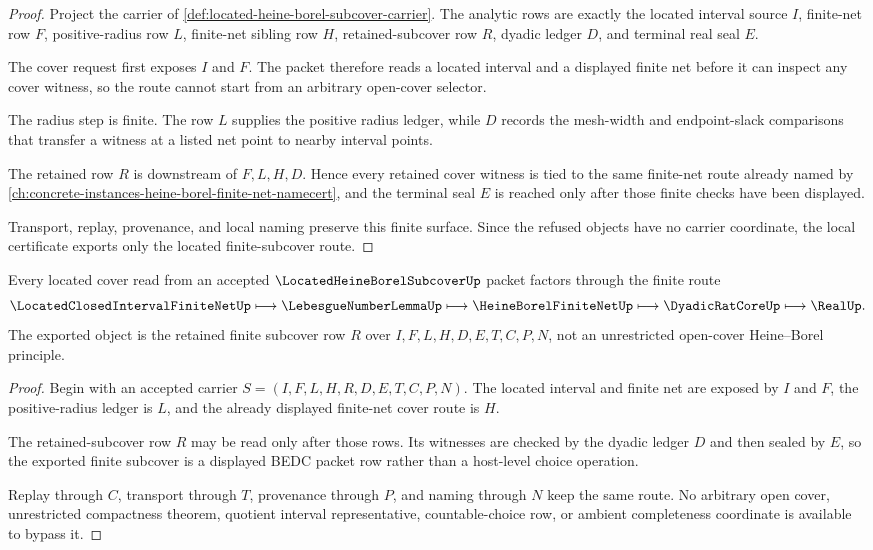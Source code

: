 \begin{proof}
Project the carrier of \autoref{def:located-heine-borel-subcover-carrier}. The analytic rows are exactly the located interval source $I$, finite-net row $F$, positive-radius row $L$, finite-net sibling row $H$, retained-subcover row $R$, dyadic ledger $D$, and terminal real seal $E$.

The cover request first exposes $I$ and $F$. The packet therefore reads a located interval and a displayed finite net before it can inspect any cover witness, so the route cannot start from an arbitrary open-cover selector.

The radius step is finite. The row $L$ supplies the positive radius ledger, while $D$ records the mesh-width and endpoint-slack comparisons that transfer a witness at a listed net point to nearby interval points.

The retained row $R$ is downstream of $F,L,H,D$. Hence every retained cover witness is tied to the same finite-net route already named by \autoref{ch:concrete-instances-heine-borel-finite-net-namecert}, and the terminal seal $E$ is reached only after those finite checks have been displayed.

Transport, replay, provenance, and local naming preserve this finite surface. Since the refused objects have no carrier coordinate, the local certificate exports only the located finite-subcover route.
\end{proof}

\begin{theorem}
\label{thm:located-heine-borel-subcover-finite-net-route}
Every located cover read from an accepted $\LocatedHeineBorelSubcoverUp$ packet factors through the finite route
$$
\LocatedClosedIntervalFiniteNetUp \longmapsto \LebesgueNumberLemmaUp \longmapsto \HeineBorelFiniteNetUp \longmapsto \DyadicRatCoreUp \longmapsto \RealUp .
$$
The exported object is the retained finite subcover row $R$ over $I,F,L,H,D,E,T,C,P,N$, not an unrestricted open-cover Heine--Borel principle.
\end{theorem}
\begin{proof}
Begin with an accepted carrier $S=(I,F,L,H,R,D,E,T,C,P,N)$. The located interval and finite net are exposed by $I$ and $F$, the positive-radius ledger is $L$, and the already displayed finite-net cover route is $H$.

The retained-subcover row $R$ may be read only after those rows. Its witnesses are checked by the dyadic ledger $D$ and then sealed by $E$, so the exported finite subcover is a displayed BEDC packet row rather than a host-level choice operation.

Replay through $C$, transport through $T$, provenance through $P$, and naming through $N$ keep the same route. No arbitrary open cover, unrestricted compactness theorem, quotient interval representative, countable-choice row, or ambient completeness coordinate is available to bypass it.
\end{proof}

